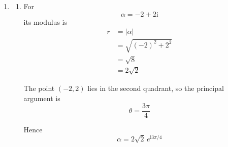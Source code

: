 \documentclass[leqno]{article}
\begin{document}
\begin{enumerate}[
  label=\textbf{\arabic*.},
  leftmargin=*,
  topsep=0pt,
  partopsep=0pt,
  parsep=0pt
]
\begin{tcolorbox}[colback=white, colframe=scarlet, title={\textbf{Solution}}, breakable, grow to left by=6mm, grow to right by=10mm]
\begin{enumerate}[label=\textbf{(\alph*)}]
\begin{enumerate}[label=(\roman*)]
    First find $\alpha\beta$:
    \begin{align*}
    \alpha\beta&=(-2+2\mathrm{i})(-2-2\mathrm{i})\\
    &=(-2)^2-(2\mathrm{i})^2\\
    &=4-(-4)\\
    &=8
    \end{align*}

    So
    \[
    8\gamma=-24
    \]
    and hence
    \[
    \gamma=-3
    \]

    \item Using the relationships between roots and coefficients:

    \[
    \alpha+\beta+\gamma=-p
    \]
    Now
    \begin{align*}
    \alpha+\beta+\gamma&=(-2+2\mathrm{i})+(-2-2\mathrm{i})+(-3)\\
    &=-7
    \end{align*}
    so
    \[
    -p=-7
    \]
    giving
    \[
    p=7
    \]

    Also
    \[
    \alpha\beta+\beta\gamma+\gamma\alpha=q
    \]
    We already know that $\alpha\beta=8$, and
    \begin{align*}
    \beta\gamma+\gamma\alpha&=\gamma(\alpha+\beta)\\
    &=(-3)\bigl((-2+2\mathrm{i})+(-2-2\mathrm{i})\bigr)\\
    &=(-3)(-4)\\
    &=12
    \end{align*}
    Therefore
    \[
    q=8+12=20
    \]

    So the values are
    \[
    p=7,\qquad q=20
    \]
  \end{enumerate}

  \item
  \begin{enumerate}[label=(\roman*)]
    \item For
    \[
    \alpha=-2+2\mathrm{i}
    \]
    its modulus is
    \begin{align*}
    r&=|\alpha|\\
    &=\sqrt{(-2)^2+2^2}\\
    &=\sqrt{8}\\
    &=2\sqrt{2}
    \end{align*}

    The point $(-2,2)$ lies in the second quadrant, so the principal argument is
    \[
    \theta=\frac{3\pi}{4}
    \]

    Hence
    \[
    \alpha=2\sqrt{2}\,e^{\mathrm{i}3\pi/4}
    \]


\end{enumerate}
\end{enumerate}
\end{tcolorbox}
\end{enumerate}
\end{document}

